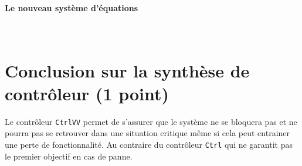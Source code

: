 \documentclass[a4paper]{book}
\begin{document}
\paragraph{Le nouveau système d'équations}\ \\
\small{}

\section{Conclusion sur la synthèse de contrôleur (1 point)}

Le contrôleur \texttt{CtrlVV} permet de s'assurer que le système ne se bloquera
pas et ne pourra pas se retrouver dans une situation critique même si cela peut
entrainer une perte de fonctionnalité.
Au contraire du contrôleur \texttt{Ctrl} qui ne garantit pas le premier
objectif en cas de panne.
\end{document}
